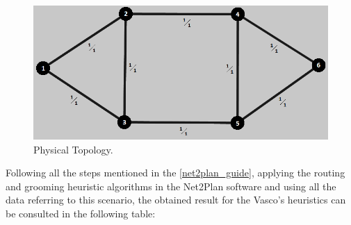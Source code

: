 \begin{figure}[H]
\centering
\includegraphics[width=13cm]{sdf/heuristic/figures/topologies/opaque_protec/high/physical_topology_high}
\caption{Physical Topology.}
\label{physical_topology_protec_ref_high_heuristic}
\end{figure}

Following all the steps mentioned in the \ref{net2plan_guide}, applying the routing and grooming heuristic algorithms in the Net2Plan software and using all the data referring to this scenario, the obtained result for the Vasco's heuristics can be consulted in the following table:

